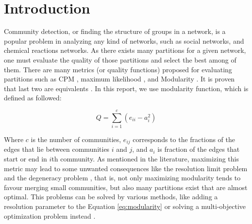 \documentclass[11pt,a4paper]{article}
\begin{document}



\section{Introduction}
\label{sec:introduction}

Community detection, or finding the structure of groups in a network, is a popular problem in analyzing any kind of networks, such as social networks, and chemical reactions networks. As there exists many partitions for a given network, one must evaluate the quality of those partitions and select the best among of them. There are many metrics (or quality functions) proposed for evaluating partitions such as CPM \cite{cpm}, maximum likelihood \cite{likelihood}, and Modularity \cite{modularity}. It is proven that last two are equivalents \cite{limodeq}. In this report, we use modularity function, which is defined as followed:

\begin{equation}
	\label{eq:modularity}
	Q = \sum^c_{i=1} \left(e_{ii} - a_i^2\right)
\end{equation}

Where $c$ is the number of communities, $e_{ij}$ corresponds to the fractions of the edges that lie between communities $i$ and $j$, and $a_i$ is fraction of the edges that start or end in $i$th community. As mentioned in the literature, maximizing this metric may lead to some unwanted consequences like the resolution limit problem \cite{reslimit, cpm} and the degeneracy problem \cite{degen}, that is, not only maximizing modularity tends to favour merging small communities, but also many partitions exist that are almost optimal. This problems can be solved by various methods, like adding a resolution parameter to the Equation \eqref{eq:modularity} or solving a multi-objective optimization problem instead \cite{reslimit}.
\end{document}
